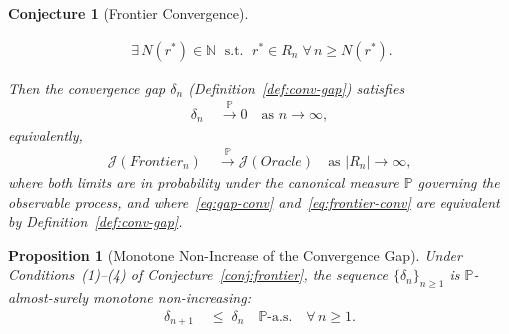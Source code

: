 \documentclass[12pt,openany]{book}
\numberwithin{equation}{chapter}
\theoremstyle{plain}
\newtheorem{proposition}[theorem]{Proposition}
\newtheorem{conjecture}[theorem]{Conjecture}
\theoremstyle{definition}
\theoremstyle{remark}
\numberwithin{equation}{chapter}
\theoremstyle{plain}
\newcommand{\Oracle}{O}
\newcommand{\Frontier}{F}
\newcommand{\calR}{\mathcal{R}}
\def\Oracle{Oracle}%
\def\Frontier{Frontier}%
\def\calR{R}%
\begin{document}
\begin{conjecture}[Frontier Convergence]
\begin{enumerate}
\begin{align}
          \;\exists\, N(r^*) \in \mathbb{N}
          \;\text{ s.t. }\;
          r^* \in \calR_n
          \;\forall\, n \geq N(r^*).
          \label{eq:identif}
        \end{align}
\end{enumerate}
Then the convergence gap $\delta_n$ (Definition~\ref{def:conv-gap})
satisfies
\begin{align}
  \delta_n
  &\;\xrightarrow{\;\mathbb{P}\;}
  0
  \quad \text{as } n \to \infty,
  \label{eq:gap-conv}
\end{align}
equivalently,
\begin{align}
  \mathcal{J}(\Frontier_n)
  &\;\xrightarrow{\;\mathbb{P}\;}
  \mathcal{J}(\Oracle)
  \quad \text{as } |\calR_n| \to \infty,
  \label{eq:frontier-conv}
\end{align}
where both limits are in probability under the canonical
measure $\mathbb{P}$ governing the observable process,
and where~\eqref{eq:gap-conv} and~\eqref{eq:frontier-conv}
are equivalent by Definition~\ref{def:conv-gap}.
\end{conjecture}


\begin{proposition}[Monotone Non-Increase of the Convergence Gap]
\label{prop:gap-mono}
Under Conditions~(1)--(4) of Conjecture~\ref{conj:frontier},
the sequence $\{\delta_n\}_{n \geq 1}$ is
$\mathbb{P}$-almost-surely monotone non-increasing:
\begin{align}
  \delta_{n+1}
  &\;\leq\;
  \delta_n
  \quad \mathbb{P}\text{-a.s.}
  \quad \forall\, n \geq 1.
  \label{eq:gap-mono}
\end{align}
\end{proposition}
\end{document}
